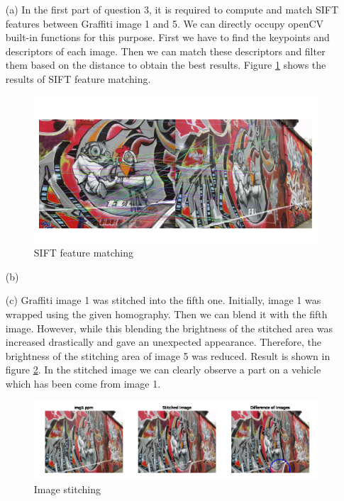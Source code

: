 \documentclass[11pt]{article}
\begin{document}
\begin{itemize}
    \item[(a)] In the first part of question 3, it is required to compute and match SIFT features between Graffiti image 1 and 5.
    We can directly occupy openCV built-in functions for this purpose. First we have to find the keypoints and descriptors of each image. Then we
    can match these descriptors and filter them based on the distance to obtain the best results. Figure \ref{SIFT feature matching} shows the 
    results of SIFT feature matching.

    \begin{figure}[!h]
        \centering
        \includegraphics[width=\textwidth]{Images/31.png}
        \caption{SIFT feature matching}
        \label{SIFT feature matching}
    \end{figure}

    \item[(b)]
    \item[(c)] Graffiti image 1 was stitched into the fifth one. Initially, image 1 was wrapped using the given homography. Then we can blend it 
    with the fifth image. However, while this blending the brightness of the stitched area was increased drastically and gave an unexpected appearance.
    Therefore, the brightness of the stitching area of image 5 was reduced. Result is shown in figure \ref{Image stitching}. In the stitched image 
    we can clearly observe a part on a vehicle which has been come from image 1. 
    
    \begin{figure}[!h]
        \centering
        \includegraphics[width=\textwidth]{Images/33.png}
        \caption{Image stitching}
        \label{Image stitching}
    \end{figure}
      
\end{itemize}

%
%
\end{document}
